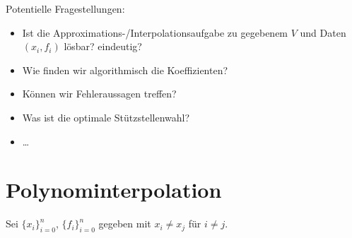 \documentclass[11pt]{scrbook}
\begin{document}
Potentielle Fragestellungen:
\begin{itemize}
	\item 
		Ist die Approximations-/Interpolationsaufgabe zu gegebenem $V$ und Daten $(x_i,f_i)$ lösbar? eindeutig?
	\item
		Wie finden wir algorithmisch die Koeffizienten?
	\item
		Können wir Fehleraussagen treffen?
	\item
		Was ist die optimale Stützstellenwahl?
	\item
		\dots
\end{itemize}


\section{Polynominterpolation}

Sei $\{x_i\}_{i=0}^n$, $\{f_i\}_{i=0}^n$ gegeben mit $x_i\neq x_j$ für $i\neq j$.
\end{document}
